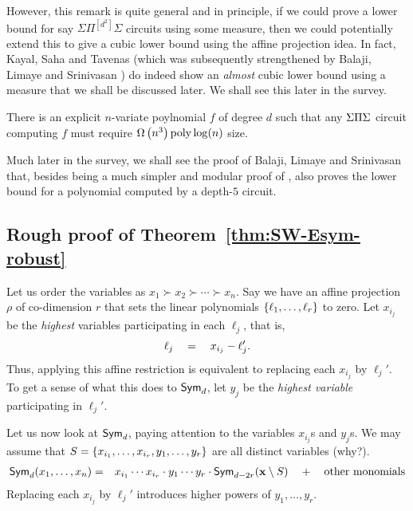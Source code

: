However, this remark is quite general and in principle, if we could prove a lower bound for say $\Sigma\Pi^{[d^2]}\Sigma$ circuits using some measure, then we could potentially extend this to give a cubic lower bound using the affine projection idea.
In fact, Kayal, Saha and Tavenas \cite{kst16} (which was subsequently strengthened by Balaji, Limaye and Srinivasan \cite{BLS16}) do indeed show an \emph{almost} cubic lower bound using a measure that we shall be discussed later.
We shall see this later in the survey.

\begin{theorem} There is an explicit $n$-variate poylnomial $f$ of degree $d$ such that any $\Sigma\Pi\Sigma$ circuit computing $f$ must require $\Omega\left(n^3\right){\operatorname{poly} \log(n)}$ size. 
\end{theorem}

Much later in the survey, we shall see the proof of Balaji, Limaye and Srinivasan \cite{BLS16} that, besides being a much simpler and modular proof of \cite{kst16}, also proves the lower bound for a polynomial computed by a depth-$5$ circuit.

\subsection{Rough proof of Theorem~\ref{thm:SW-Esym-robust}}

Let us order the variables as $x_1 \succ x_2 \succ \cdots \succ x_n$.
Say we have an affine projection $\rho$ of co-dimension $r$ that sets the linear polynomials $\left\{\ell_1,\ldots, \ell_r\right\}$ to zero. Let $x_{i_j}$ be the \emph{highest} variables participating in each $\ell_j$, that is,
\[
  \ell_j \quad = \quad x_{i_j} - \ell_j'.
\]
Thus, applying this affine restriction is equivalent to replacing each $x_{i_j}$ by $\ell_{j}'$. To get a sense of what this does to $\operatorname{\mathsf{Sym}}_d$, let $y_j$ be the \emph{highest variable} participating in $\ell_j'$.

Let us now look at $\operatorname{\mathsf{Sym}}_d$, paying attention to the variables $x_{i_j}$s and $y_j$s. We may assume that  $S = \left\{x_{i_1},\ldots, x_{i_r}, y_1,\ldots, y_r\right\}$ are all distinct variables (why?).
\begin{eqnarray*}
  \operatorname{\mathsf{Sym}}_d(x_1,\ldots, x_n) & = &  x_{i_1}\cdots x_{i_r}\cdot y_1\cdots y_r \cdot \operatorname{\mathsf{Sym}}_{d - 2r}(\mathbf{x} \setminus S) \quad + \quad \text{other monomials}
\end{eqnarray*}
Replacing each $x_{i_j}$ by $\ell_j'$ introduces higher powers of $y_1,\ldots, y_r$.

